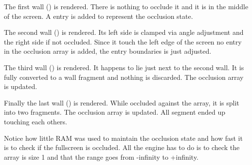 The first wall () is rendered. There is nothing to occlude it and it is in the middle of the screen. A entry is added to represent the occlusion state.
\par
\begin{minipage}{0.54\textwidth}
\vspace*{2.5mm}
\end{minipage}
\begin{minipage}{0.46\textwidth}
\centering
{}
\end{minipage}
\par



The second wall () is rendered. Its left side is clamped via angle adjustment and the right side if not occluded. Since it touch the left edge of the screen no entry in the occlusion array is added, the entry boundaries is just adjusted.
\par
\begin{minipage}{0.54\textwidth}
\vspace*{2.5mm}
\end{minipage}
\begin{minipage}{0.45\textwidth}
\centering
{}
\end{minipage}
\par





The third wall () is rendered. It happens to lie just next to the second wall. It is fully converted to a wall fragment and nothing is discarded. The occlusion array is updated.
\begin{minipage}{0.54\textwidth}
\vspace*{2.5mm}
\end{minipage}
\begin{minipage}{0.46\textwidth}
\centering
{}
\end{minipage}
\par


Finally the last wall () is rendered. While occluded against the array, it is split into two fragments. The occlusion array is updated. All segment ended up touching each others. 
\begin{minipage}{0.54\textwidth}
\vspace*{2.5mm}
\end{minipage}
\begin{minipage}{0.46\textwidth}
\centering
{}
\end{minipage}
\par
Notice how little RAM was used to maintain the occlusion state and how fast it is to check if the fullscreen is occluded. All the engine has to do is to check the array is size 1 and that the range goes from -infinity to +infinity.



